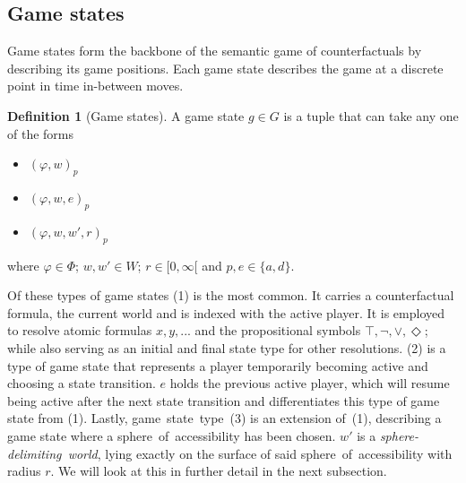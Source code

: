 \documentclass[a4paper,american,10pt]{paper}
\theoremstyle{definition}\newtheorem{definition}{Definition}
\begin{document}
\subsection{Game states}
Game states form the backbone of the semantic game of counterfactuals by describing its game positions. Each game state describes the game at a discrete point in time in-between moves.
\begin{definition}[Game states]
A game state $g\in G$ is a tuple that can take any one of the forms
\begin{itemize}
	\item[(1)] $(\varphi ,w)_p$
	\item[(2)] $(\varphi ,w, e)_p$
	\item[(3)] $(\varphi ,w,w',r)_p$
\end{itemize}
where $\varphi\in\Phi$; $w,w'\in W$; $r\in [0,\infty [$ and $p,e\in\{ a,d\}$.
\end{definition}
\noindent Of these types of game states (1) is the most common. It carries a counterfactual formula, the current world and is indexed with the active player. It is employed to resolve atomic formulas $x,y,...$ and the propositional symbols $\top,\neg,\vee,\Diamond$; while also serving as an initial and final state type for other resolutions. (2) is a type of game state that represents a player temporarily becoming active and choosing a state transition. $e$ holds the previous active player, which will resume being active after the next state transition and differentiates this type of game state from (1). Lastly, game~state~type~(3) is an extension of~(1), describing a game state where a sphere~of~accessibility has been chosen. $w'$ is a \textit{sphere-delimiting~world}, lying exactly on the surface of said sphere~of~accessibility with radius $r$. We will look at this in further detail in the next subsection.
\end{document}
